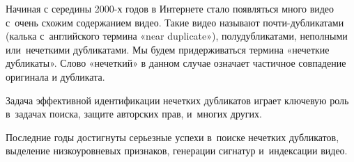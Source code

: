 \documentclass{.local/lib/classes/ndvr-super-article-standalone}
\begin{document}


    Начиная с середины 2000-х годов в Интернете
    стало появляться много видео с~очень схожим содержанием видео.
    Такие видео называют почти-дубликатами
    (калька с~английского термина «near duplicate»), полудубликатами,
    неполными или~нечеткими дубликатами.
    Мы будем придерживаться термина «нечеткие дубликаты».
    Слово «нечеткий» в данном случае означает частичное совпадение
    оригинала и дубликата.

    Задача эффективной идентификации нечетких дубликатов играет ключевую
    роль в~задачах поиска, защите авторских прав, и~многих других.

    Последние годы достигнуты серьезные успехи в~поиске нечетких дубликатов,
    выделение низкоуровневых признаков, генерации сигнатур и~индексации видео.

\end{document}
